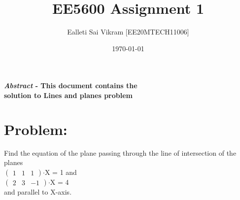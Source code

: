 \documentclass[twocolumn]{article}
\begin{document}
\title{EE5600 Assignment 1}
\author{Ealleti Sai Vikram [EE20MTECH11006]}
\date{\today}
\maketitle

\textbf{\emph{Abstract} - This document contains the \\solution to Lines and planes problem}



\section*{Problem:}
Find the equation of the plane passing through
the line of intersection of the planes
\\   
\hspace*{2cm}  
$\begin{pmatrix}1&1&1\end{pmatrix}$$\cdot$X = 1  and
\\
\hspace*{2cm}
$\begin{pmatrix}2&3&-1\end{pmatrix}$$\cdot$X = 4
\\
and parallel to X-axis.
\end{document}
